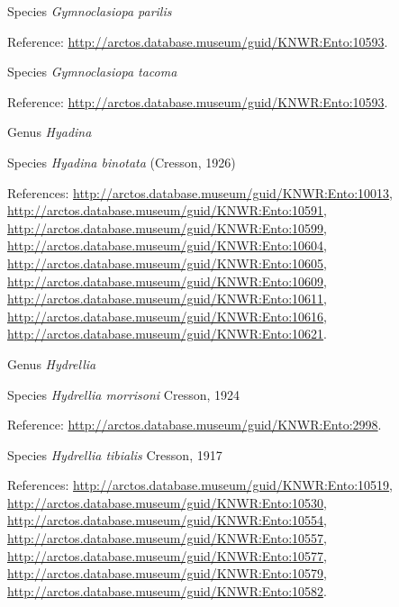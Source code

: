 \documentclass[9pt, article]{memoir}
\begin{document}
\begin{multicols}{2}
\vspace{6pt}\noindent\hspace{36pt}Species \textit{Gymnoclasiopa parilis}


Reference: 
\url{http://arctos.database.museum/guid/KNWR:Ento:10593}.

\vspace{6pt}\noindent\hspace{36pt}Species \textit{Gymnoclasiopa tacoma}


Reference: 
\url{http://arctos.database.museum/guid/KNWR:Ento:10593}.

\vspace{6pt}\noindent\hspace{30pt}Genus \textit{Hyadina}


\vspace{6pt}\noindent\hspace{36pt}Species \textit{Hyadina binotata} (Cresson, 1926)


References: 
\url{http://arctos.database.museum/guid/KNWR:Ento:10013}, 
\url{http://arctos.database.museum/guid/KNWR:Ento:10591}, 
\url{http://arctos.database.museum/guid/KNWR:Ento:10599}, 
\url{http://arctos.database.museum/guid/KNWR:Ento:10604}, 
\url{http://arctos.database.museum/guid/KNWR:Ento:10605}, 
\url{http://arctos.database.museum/guid/KNWR:Ento:10609}, 
\url{http://arctos.database.museum/guid/KNWR:Ento:10611}, 
\url{http://arctos.database.museum/guid/KNWR:Ento:10616}, 
\url{http://arctos.database.museum/guid/KNWR:Ento:10621}.

\vspace{6pt}\noindent\hspace{30pt}Genus \textit{Hydrellia}


\vspace{6pt}\noindent\hspace{36pt}Species \textit{Hydrellia morrisoni} Cresson, 1924


Reference: 
\url{http://arctos.database.museum/guid/KNWR:Ento:2998}.

\vspace{6pt}\noindent\hspace{36pt}Species \textit{Hydrellia tibialis} Cresson, 1917


References: 
\url{http://arctos.database.museum/guid/KNWR:Ento:10519}, 
\url{http://arctos.database.museum/guid/KNWR:Ento:10530}, 
\url{http://arctos.database.museum/guid/KNWR:Ento:10554}, 
\url{http://arctos.database.museum/guid/KNWR:Ento:10557}, 
\url{http://arctos.database.museum/guid/KNWR:Ento:10577}, 
\url{http://arctos.database.museum/guid/KNWR:Ento:10579}, 
\url{http://arctos.database.museum/guid/KNWR:Ento:10582}.


\end{multicols}
\end{document}
